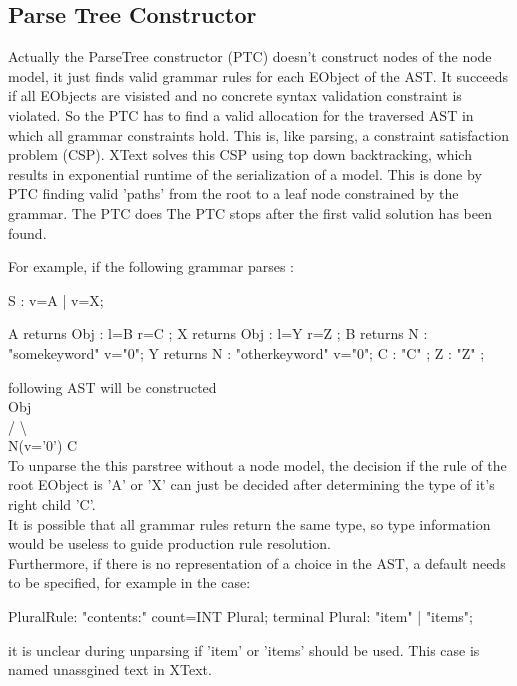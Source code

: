 \subsection{Parse Tree Constructor}  \label{xtxt:ptc}
Actually the ParseTree constructor (PTC) doesn't construct nodes of the node model, it just finds valid grammar rules for each EObject of the AST. It succeeds if all EObjects are visisted and no concrete syntax validation constraint is violated. So the PTC has to find a valid allocation for the traversed AST in which all grammar constraints hold.  This is, like parsing, a constraint satisfaction problem (CSP). XText solves this CSP  using top down backtracking, which results in exponential runtime of the serialization of a model. This is done by PTC finding valid 'paths' from the root to a leaf node constrained by the grammar. The PTC does The PTC stops after the first valid solution has been found. 

For example, if the following grammar parses :
\begin{xtxt}
S  	:  	v=A 
	| 	v=X;

A returns Obj	: 	l=B r=C   ;
X returns Obj	: 	l=Y r=Z   ;
B returns N  	:  	"somekeyword" 	v="0";
Y returns N  	: 	"otherkeyword" 	v="0";
C 			:  	 "C" ;
Z 			: 	 "Z" ;
\end{xtxt}
following AST will be constructed  \\ 
      Obj			\\
     /   \textbackslash		\\
N(v='0')   C	\\
To unparse the this parstree without a node model, the decision if the rule of the root EObject is 'A' or 'X' can just be decided after determining the type of it's right child 'C'. \\

It is possible that all grammar rules return the same type, so type information would be useless to guide production rule resolution.\\
Furthermore, if there is no representation of a choice in the AST, a default needs to be specified, for example in the case: 
\begin{xtxt}
PluralRule: "contents:" count=INT Plural;
terminal Plural: "item" | "items";
\end{xtxt}
it is unclear during unparsing if 'item' or 'items' should be used. This case is named unassgined text in XText.

